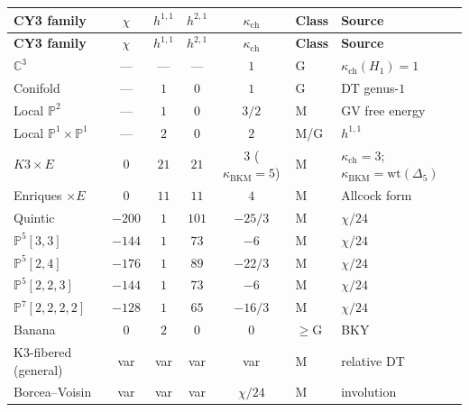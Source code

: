 \documentclass[11pt]{article}
\newcommand{\C}{\mathbb{C}}
\newcommand{\bP}{\mathbb{P}}
\begin{document}
\begin{center}
\renewcommand{\arraystretch}{1.3}
\small
\begin{longtable}{lccccll}
 \toprule
 \textbf{CY3 family} & $\chi$ & $h^{1,1}$ & $h^{2,1}$ & $\kappa_{\mathrm{ch}}$ & \textbf{Class} & \textbf{Source} \\
 \midrule
 \endfirsthead
 \toprule
 \textbf{CY3 family} & $\chi$ & $h^{1,1}$ & $h^{2,1}$ & $\kappa_{\mathrm{ch}}$ & \textbf{Class} & \textbf{Source} \\
 \midrule
 \endhead
 $\C^3$ & --- & --- & --- & $1$ & G & $\kappa_{\mathrm{ch}}(H_1) = 1$ \\
 Conifold & --- & $1$ & $0$ & $1$ & G & DT genus-$1$ \\
 Local $\bP^2$ & --- & $1$ & $0$ & $3/2$ & M & GV free energy \\
 Local $\bP^1 \!\times\! \bP^1$ & --- & $2$ & $0$ & $2$ & M/G & $h^{1,1}$ \\
 $K3 \times E$ & $0$ & $21$ & $21$ & $3$ ($\kappa_{\mathrm{BKM}}\!=\!5$) & M & $\kappa_{\mathrm{ch}} = 3$; $\kappa_{\mathrm{BKM}} = \mathrm{wt}(\Delta_5)$ \\
 Enriques $\times E$ & $0$ & $11$ & $11$ & $4$ & M & Allcock form \\
 Quintic & $-200$ & $1$ & $101$ & $-25/3$ & M & $\chi/24$ \\
 $\bP^5[3,3]$ & $-144$ & $1$ & $73$ & $-6$ & M & $\chi/24$ \\
 $\bP^5[2,4]$ & $-176$ & $1$ & $89$ & $-22/3$ & M & $\chi/24$ \\
 $\bP^5[2,2,3]$ & $-144$ & $1$ & $73$ & $-6$ & M & $\chi/24$ \\
 $\bP^7[2,2,2,2]$ & $-128$ & $1$ & $65$ & $-16/3$ & M & $\chi/24$ \\
 Banana & $0$ & $2$ & $0$ & $0$ & $\geq$G & BKY \\
 K3-fibered (general) & var & var & var & var & M & relative DT \\
 Borcea--Voisin & var & var & var & $\chi/24$ & M & involution \\
 \bottomrule
\end{longtable}
\end{center}
\end{document}
